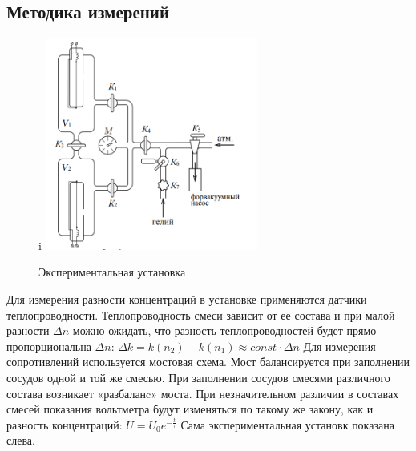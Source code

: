 \subsection*{Методика измерений}
\indent
\begin{figure}{i}
    \centering
    \includegraphics[width=7cm,height=7cm]{mainsetup.png}
    \caption{Экспериментальная установка}
\end{figure}


Для измерения разности концентраций в установке применяются датчики теплопроводности. 
Теплопроводность смеси зависит от ее состава и при малой разности $\Delta n$
можно ожидать, что разность теплопроводностей будет прямо пропорциональна $\Delta n$:
$\Delta k = k(n_2) - k(n_1) \approx const \cdot \Delta n$
Для измерения сопротивлений используется мостовая схема.
Мост балансируется при заполнении сосудов одной и той же
смесью. При заполнении сосудов смесями различного состава возникает
«разбаланc» моста. При незначительном различии в составах смесей показания вольтметра
будут изменяться по такому же закону, как и разность концентраций: 
$U = U_0e^{-\frac{t}{\tau}}$
Сама экспериментальная установк показана слева. 

